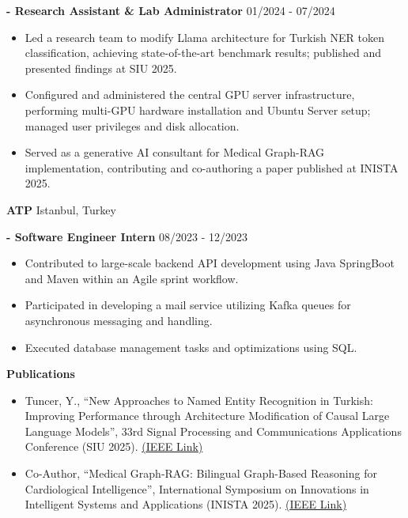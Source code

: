 \documentclass[paper=a4,fontsize=10.3pt]{scrartcl} %
\begin{document}
\textbf{- Research Assistant \& Lab Administrator} \hfill 01/2024 - 07/2024
\begin{itemize}[noitemsep]
    \item Led a research team to modify Llama architecture for Turkish NER token classification, achieving state-of-the-art benchmark results; published and presented findings at SIU 2025.
    \item Configured and administered the central GPU server infrastructure, performing multi-GPU hardware installation and Ubuntu Server setup; managed user privileges and disk allocation.
    \item Served as a generative AI consultant for Medical Graph-RAG implementation, contributing and co-authoring a paper published at INISTA 2025.
\end{itemize}

\textbf{ATP} \hfill Istanbul, Turkey

\textbf{- Software Engineer Intern} \hfill 08/2023 - 12/2023
\begin{itemize}[noitemsep]
    \item Contributed to large-scale backend API development using Java SpringBoot and Maven within an Agile sprint workflow.
    \item Participated in developing a mail service utilizing Kafka queues for asynchronous messaging and handling.
    \item Executed database management tasks and optimizations using SQL.
\end{itemize}

\begin{center}
    \textbf{Publications}
    \hrulefill
\end{center}
\begin{itemize}[noitemsep]
    \item Tuncer, Y., “New Approaches to Named Entity Recognition in Turkish: Improving Performance through Architecture Modification of Causal Large Language Models”, 33rd Signal Processing and Communications Applications Conference (SIU 2025). \href{https://ieeexplore.ieee.org/document/11112472}{(\underline{IEEE Link})}
    \item Co-Author, “Medical Graph-RAG: Bilingual Graph-Based Reasoning for Cardiological Intelligence”, International Symposium on Innovations in Intelligent Systems and Applications (INISTA 2025). \href{https://ieeexplore.ieee.org/document/11249583}{(\underline{IEEE Link})}
\end{itemize}
\end{document}
